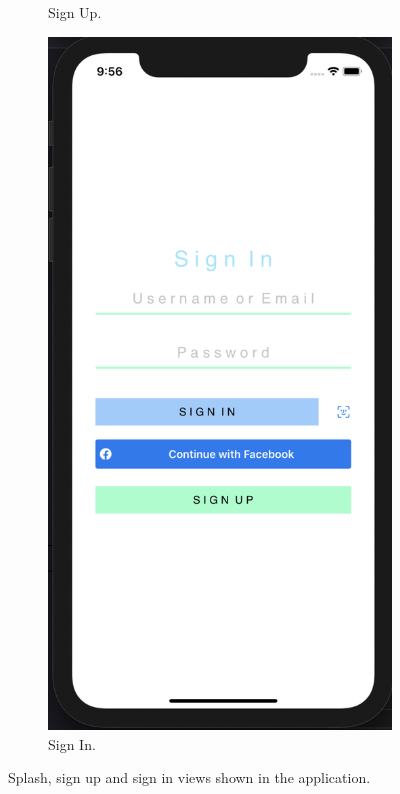 \begin{figure}[H]
\begin{subfigure}[b]{0.3\textwidth}
        \caption{Sign Up.}
        \label{fig:sign_up_app}
    \end{subfigure}
    \hfill
    \begin{subfigure}[b]{0.3\textwidth}
        \centering
        \includegraphics[width=\textwidth]{./graphics/Implementation/Splash_Sign_Up_Sign_In/signin.png}
        \caption{Sign In.}
        \label{fig:sign_in_app}
    \end{subfigure}
    
    \caption{Splash, sign up and sign in views shown in the application.}
    \label{fig:splash_signup_signin_app}
\end{figure}